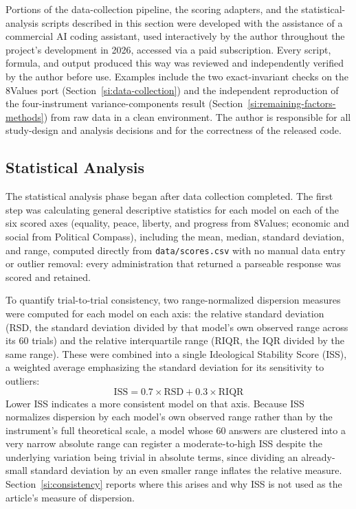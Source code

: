 \documentclass[11pt]{article}
\begin{document}
Portions of the data-collection pipeline, the scoring adapters, and the
statistical-analysis scripts described in this section were developed with
the assistance of a commercial AI coding assistant, used interactively by
the author throughout the project's development in 2026, accessed via a paid
subscription. Every script, formula, and output produced this way was
reviewed and independently verified by the author before use. Examples
include the two exact-invariant checks on the 8Values port (Section~\ref{si:data-collection})
and the independent reproduction of the four-instrument variance-components
result (Section~\ref{si:remaining-factors-methods}) from raw data in a clean
environment. The author is responsible for all study-design and
analysis decisions and for the correctness of the released code.

\subsection{Statistical Analysis}
\label{si:stats}

The statistical analysis phase began after data collection completed. The
first step was calculating general descriptive statistics for each model on
each of the six scored axes (equality, peace, liberty, and progress from
8Values; economic and social from Political Compass), including the mean,
median, standard deviation, and range, computed directly from
\texttt{data/scores.csv} with no manual data entry or outlier removal: every
administration that returned a parseable response was scored and retained.

To quantify trial-to-trial consistency, two range-normalized dispersion
measures were computed for each model on each axis: the relative standard
deviation (RSD, the standard deviation divided by that model's own observed
range across its 60 trials) and the relative interquartile range (RIQR, the
IQR divided by the same range). These were combined into a single
Ideological Stability Score (ISS), a weighted average emphasizing the
standard deviation for its sensitivity to outliers:
\begin{equation}
  \mathrm{ISS} = 0.7 \times \mathrm{RSD} + 0.3 \times \mathrm{RIQR}
  \label{eq:iss}
\end{equation}
Lower ISS indicates a more consistent model on that axis. Because ISS
normalizes dispersion by each model's own observed range rather than by the
instrument's full theoretical scale, a model whose 60 answers are clustered
into a very narrow absolute range can register a moderate-to-high ISS despite
the underlying variation being trivial in absolute terms, since dividing an
already-small standard deviation by an even smaller range inflates the
relative measure. Section~\ref{si:consistency} reports where this arises and
why ISS is not used as the article's measure of dispersion.
\end{document}
